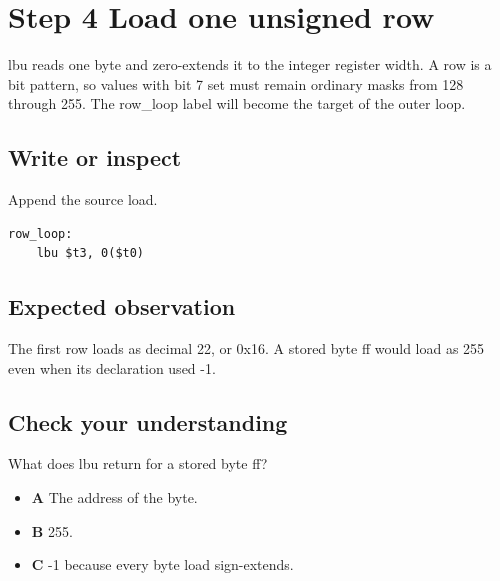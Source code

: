 \section{Step 4 Load one unsigned
  row}\label{003-eight-byte-sprite-s04-step-4-load-one-unsigned-row}

lbu reads one byte and zero-extends it to the integer register width. A
row is a bit pattern, so values with bit 7 set must remain ordinary
masks from 128 through 255. The row\_loop label will become the target
of the outer loop.

\subsection{Write or
  inspect}\label{003-eight-byte-sprite-s04-write-or-inspect}

Append the source load.

\begin{verbatim}
row_loop:
    lbu $t3, 0($t0)
\end{verbatim}

\subsection{Expected
  observation}\label{003-eight-byte-sprite-s04-expected-observation}

The first row loads as decimal 22, or 0x16. A stored byte ff would load
as 255 even when its declaration used -1.

\subsection{Check your
  understanding}\label{003-eight-byte-sprite-s04-check-your-understanding}

What does lbu return for a stored byte ff?

\begin{itemize}
  \tightlist
  \item
        \textbf{A} The address of the byte.
  \item
        \textbf{B} 255.
  \item
        \textbf{C} -1 because every byte load sign-extends.
\end{itemize}
